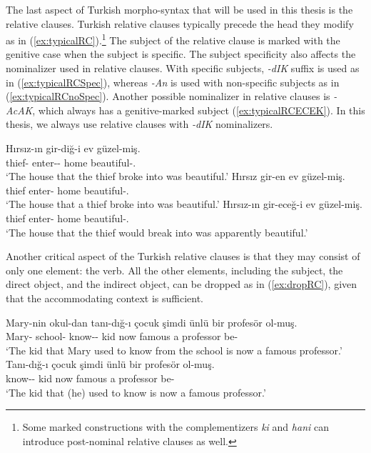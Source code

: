The last aspect of Turkish morpho-syntax that will be used in this thesis is the relative clauses. Turkish relative clauses typically precede the head they modify as in (\ref{ex:typicalRC}).\footnote{Some marked constructions with the complementizers \emph{ki} and \emph{hani} can introduce post-nominal relative clauses as well.} The subject of the relative clause is marked with the genitive case when the subject is specific. The subject specificity also affects the nominalizer used in relative clauses. With specific subjects, \emph{-dIK} suffix is used as in (\ref{ex:typicalRCSpec}), whereas \emph{-An} is used with non-specific subjects as in (\ref{ex:typicalRCnoSpec}). Another possible nominalizer in relative clauses is \emph{-AcAK}, which always has a genitive-marked subject (\ref{ex:typicalRCECEK}). In this thesis, we always use relative clauses with \emph{-dIK} nominalizers.  


\ea \label{ex:typicalRC}
  \ea \label{ex:typicalRCSpec}
    \gll H{\i}rs{\i}z-{\i}n gir-di\u{g}-i ev g{\"u}zel-mi\c{s}.\\
    thief-\Gen{} enter-\Nmlz{}-\Poss{} home beautiful-\Evid{}.\\
    \glt `The house that the thief broke into was beautiful.'
  \ex \label{ex:typicalRCnoSpec}
    \gll H{\i}rs{\i}z gir-en ev g{\"u}zel-mi\c{s}.\\
    thief enter-\Nmlz{} home beautiful-\Evid{}.\\
    \glt `The house that a thief broke into was beautiful.'
  \ex \label{ex:typicalRCECEK}
    \gll H{\i}rs{\i}z-{\i}n gir-ece\u{g}-i ev g{\"u}zel-mi\c{s}.\\
    thief enter-\Nmlz{} home beautiful-\Evid{}.\\
    \glt `The house that the thief would break into was apparently beautiful.'
  \z
\z

Another critical aspect of the Turkish relative clauses is that they may consist of only one element: the verb. All the other elements, including the subject, the direct object, and the indirect object, can be dropped as in (\ref{ex:dropRC}), given that the accommodating context is sufficient.

\ea \label{ex:dropRC}
  \ea \label{ex:fullRC}
    \gll Mary-nin okul-dan tan{\i}-d{\i}\u{g}-{\i} \c{c}ocuk \c{s}imdi {\"u}nl{\"u} bir profes{\"o}r ol-mu\c{s}.\\
    Mary-\Gen{} school-\Abl{} know-\Nmlz{}-\Poss{} kid now famous a professor be-\Evid{}\\
    \glt `The kid that Mary used to know from the school is now a famous professor.'
  \ex \label{ex:droppedRC}
    \gll Tan{\i}-d{\i}\u{g}-{\i} \c{c}ocuk \c{s}imdi {\"u}nl{\"u} bir profes{\"o}r ol-mu\c{s}.\\
    know-\Nmlz{}-\Poss{} kid now famous a professor be-\Evid{}\\
    \glt `The kid that (he) used to know is now a famous professor.'
  \z
\z


